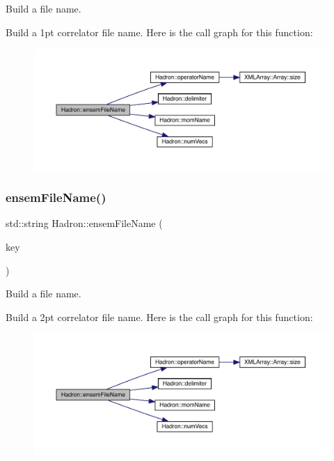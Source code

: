 Build a file name. 

Build a 1pt correlator file name. Here is the call graph for this function\+:
\nopagebreak
\begin{figure}[H]
\begin{center}
\leavevmode
\includegraphics[width=350pt]{d1/daf/namespaceHadron_af97a705730e771598736c0ddcec48fea_cgraph}
\end{center}
\end{figure}
\mbox{\label{namespaceHadron_a031dddf6856dd71ac8114cf9c4106268}} 
\subsubsection{\texorpdfstring{ensemFileName()}{ensemFileName()}\hspace{0.1cm}{\footnotesize\ttfamily [3/12]}}
{\footnotesize\ttfamily std\+::string Hadron\+::ensem\+File\+Name (\begin{DoxyParamCaption}\item[{const \mbox{\hyperlink{structFF_1_1KeyHadron2PtCorr__t}{F\+F\+::\+Key\+Hadron2\+Pt\+Corr\+\_\+t}} \&}]{key }\end{DoxyParamCaption})}



Build a file name. 

Build a 2pt correlator file name. Here is the call graph for this function\+:
\nopagebreak
\begin{figure}[H]
\begin{center}
\leavevmode
\includegraphics[width=350pt]{d1/daf/namespaceHadron_a031dddf6856dd71ac8114cf9c4106268_cgraph}
\end{center}
\end{figure}
\mbox{\label{namespaceHadron_a1043f4c7b4a30f750e2484e69ff0a25b}} 
